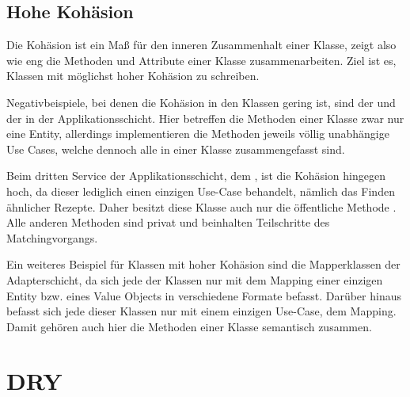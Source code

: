 \subsection{Hohe Kohäsion}
Die Kohäsion ist ein Maß für den inneren Zusammenhalt einer Klasse, zeigt also wie eng die Methoden und Attribute einer Klasse zusammenarbeiten. Ziel ist es, Klassen mit möglichst hoher Kohäsion zu schreiben.

Negativbeispiele, bei denen die Kohäsion in den Klassen gering ist, sind der  und der  in der Applikationsschicht. Hier betreffen die Methoden einer Klasse zwar nur eine Entity, allerdings implementieren die Methoden jeweils völlig unabhängige Use Cases, welche dennoch alle in einer Klasse zusammengefasst sind.

Beim dritten Service der Applikationsschicht, dem , ist die Kohäsion hingegen hoch, da dieser lediglich einen einzigen Use-Case behandelt, nämlich das Finden ähnlicher Rezepte. Daher besitzt diese Klasse auch nur die öffentliche Methode . Alle anderen Methoden sind privat und beinhalten Teilschritte des Matchingvorgangs.

Ein weiteres Beispiel für Klassen mit hoher Kohäsion sind die Mapperklassen der Adapterschicht, da sich jede der Klassen nur mit dem Mapping einer einzigen Entity bzw. eines Value Objects in verschiedene Formate befasst. Darüber hinaus befasst sich jede dieser Klassen nur mit einem einzigen Use-Case, dem Mapping. Damit gehören auch hier die Methoden einer Klasse semantisch zusammen.

\section{DRY}
